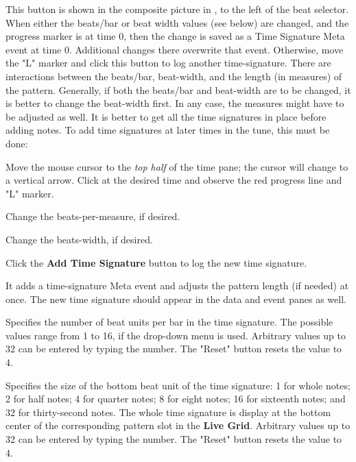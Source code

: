    This button is shown in the composite picture in
   ,
   to the left of the beat selector.
   When either the beats/bar or beat width values (see below) are changed,
   and the progress marker is at time 0, then the change is
   saved as a Time Signature Meta event at time 0. Additional changes there
   overwrite that event.
   Otherwise, move the "L" marker and click this button to log another
   time-signature.
   There are interactions between the beats/bar, beat-width, and the length (in
   measures) of the pattern.
   Generally, if both the beats/bar and beat-width are to be changed,
   it is better to change the beat-width first.
   In any case, the measures might have to be adjusted as well.
   It is better to get all the time signatures in place before adding notes.
   To add time signatures at later times in the tune, this must be done:

   \begin{enumber}
      \item Move the mouse cursor to the \textsl{top half} of the time pane;
         the cursor will change to a vertical arrow. Click at the desired time
         and observe the red progress line and "L" marker.
      \item Change the beats-per-measure, if desired.
      \item Change the beats-width, if desired.
      \item Click the \textbf{Add Time Signature} button to log the
         new time signature.
   \end{enumber}

   It adds a time-signature Meta event and adjusts the pattern
   length (if needed) at once.
   The new time signature should appear in the data and event panes as well.

   Specifies the number of beat units per bar in the time signature.
   The possible values range from 1 to 16, if the drop-down menu is used.
   Arbitrary values up to 32 can be entered by typing the number.
   The "Reset" button resets the value to 4.

   Specifies the size of the bottom beat unit of the time signature:
   1 for whole notes; 2 for half notes; 4 for quarter notes; 8 for eight notes;
   16 for sixteenth notes; and 32 for thirty-second notes.
   The whole time signature is display at the bottom center of the
   corresponding pattern slot in the \textbf{Live Grid}.
   Arbitrary values up to 32 can be entered by typing the number.
   The "Reset" button resets the value to 4.

